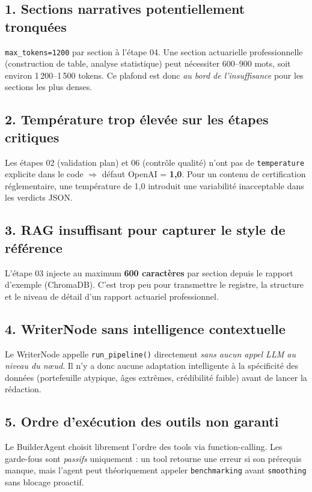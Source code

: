 \documentclass[12pt,a4paper]{article}
\begin{document}
\begin{limitbox}

\subsection*{1. Sections narratives potentiellement tronquées}
\texttt{max\_tokens=1200} par section à l'étape 04. Une section actuarielle professionnelle
(construction de table, analyse statistique) peut nécessiter 600–900 mots, soit
environ 1\,200–1\,500 tokens. Ce plafond est donc \emph{au bord de l'insuffisance}
pour les sections les plus denses.

\subsection*{2. Température trop élevée sur les étapes critiques}
Les étapes 02 (validation plan) et 06 (contrôle qualité) n'ont pas de
\texttt{temperature} explicite dans le code $\Rightarrow$ défaut OpenAI = \textbf{1,0}.
Pour un contenu de certification réglementaire, une température de 1,0 introduit
une variabilité inacceptable dans les verdicts JSON.

\subsection*{3. RAG insuffisant pour capturer le style de référence}
L'étape 03 injecte au maximum \textbf{600 caractères} par section depuis le rapport
d'exemple (ChromaDB). C'est trop peu pour transmettre le registre, la structure
et le niveau de détail d'un rapport actuariel professionnel.

\subsection*{4. WriterNode sans intelligence contextuelle}
Le WriterNode appelle \texttt{run\_pipeline()} directement \emph{sans aucun appel LLM
au niveau du nœud}. Il n'y a donc aucune adaptation intelligente à la spécificité
des données (portefeuille atypique, âges extrêmes, crédibilité faible) avant
de lancer la rédaction.

\subsection*{5. Ordre d'exécution des outils non garanti}
Le BuilderAgent choisit librement l'ordre des tools via function-calling.
Les garde-fous sont \emph{passifs} uniquement : un tool retourne une erreur si son
prérequis manque, mais l'agent peut théoriquement appeler \texttt{benchmarking}
avant \texttt{smoothing} sans blocage proactif.


\end{limitbox}
\end{document}
